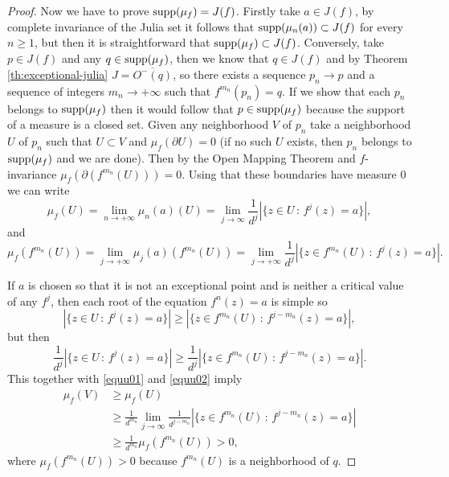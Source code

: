 \begin{proof}
Now we have to prove $\text{supp}(\mu_f)=J(f)$. Firstly take $a\in J(f)$, by complete invariance of the Julia set it follows that $\text{supp}(\mu_n(a)) \subset J(f)$ for every $n\geq 1$, but then it is straightforward that $\text{supp}(\mu_f) \subset J(f)$. Conversely, take $p\in J(f)$ and any $q\in \text{supp}(\mu_f)$, then we know that $q\in J(f)$ and by Theorem \ref{th:exceptional-julia} $J = \overline{O^-(q)}$, so there exists a sequence $p_n \rightarrow p$ and a sequence of integers $m_n \rightarrow +\infty$ such that $f^{m_n}(p_n)=q$. If we show that each $p_n$ belongs to $\text{supp}(\mu_f)$ then it would follow that $p\in \text{supp}(\mu_f)$ because the support of a measure is a closed set. Given any neighborhood $V$ of $p_n$ take a neighborhood $U$ of $p_n$ such that $U\subset V$ and $\mu_f(\partial U)=0$ (if no such $U$ exists, then $p_n$ belongs to $\text{supp}(\mu_f)$ and we are done). Then by the Open Mapping Theorem and $f$-invariance $\mu_f(\partial (f^{m_n}(U)))=0$. Using that these boundaries have measure $0$ we can write
\begin{equation}\label{equu01}
\mu_f(U) = \lim_{n \rightarrow +\infty} \mu_n(a)(U) = \lim_{j \rightarrow \infty} \frac{1}{d^j}\left|\{z\in U\,:\, f^j(z) =a\}\right|,
\end{equation}
and 
\begin{equation}\label{equu02}
\mu_f(f^{m_n}(U)) = \lim_{j \rightarrow+\infty} \mu_j(a)(f^{m_n}(U)) = \lim_{j \rightarrow +\infty}\frac{1}{d^j} \left| \{ z\in f^{m_n}(U) \,:\, f^j(z)=a\}\right|.
\end{equation}

If $a$ is chosen so that it is not an exceptional point and is neither a critical value of any $f^j$, then each root of the equation $f^n(z) = a$ is simple so
$$\left | \{z\in U\,:\, f^j(z) =a\}\right| \geq \left |\{z\in f^{m_n}(U) \,:\,f^{j-m_n}(z)=a\}\right|,$$
but then
$$\frac{1}{d^j}\left| \{z\in U\,:\, f^j(z) =a\}\right| \geq \frac{1}{d^{j}}\left| \{z\in f^{m_n}(U) \,:\,f^{j-m_n}(z)=a\} \right|.$$
This together with \eqref{equu01} and \eqref{equu02} imply
\begin{align*}
\mu_f(V)&\geq \mu_f(U)\\ &\geq \frac{1}{d^{m_n}}\lim_{j\rightarrow \infty} \frac{1}{d^{j-m_n}}\left| \{z\in f^{m_n}(U) \,:\,f^{j-m_n}(z)=a\} \right|\\
&\geq \frac{1}{d^{m_n}}\mu_f(f^{m_n}(U))>0,
\end{align*}
where $\mu_f(f^{m_n}(U))>0$ because $f^{m_n}(U)$ is a neighborhood of $q$. 
\end{proof}

